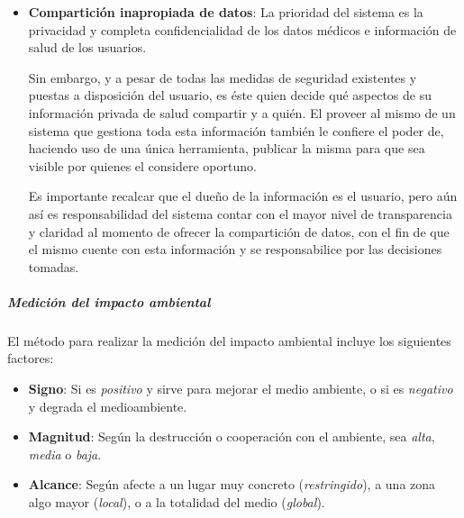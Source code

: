 {\begin{itemize}
    La implantación del sistema y uso por parte de la sociedad implicaría una menor concurrencia a hospitales e instituciones de salud, considerando aquellas asistencias que tengan por propósito el retiro de estudios médicos, consultas de baja complejidad o entrega de resultados médicos al profesional que los requirió, para su lectura y análisis.
    Esto tiene por consecuencia principal una menor cantidad de personas trasladándose a las instituciones de salud, lo que provoca reducir el parque automotor activo y, por lo tanto, eliminar una fracción de la contaminación vehicular existente en la actualidad.
    
    
    \item \textbf{Compartición inapropiada de datos}:
    La prioridad del sistema es la privacidad y completa confidencialidad de los datos médicos e información de salud de los usuarios.
    
    Sin embargo, y a pesar de todas las medidas de seguridad existentes y puestas a disposición del usuario, es éste quien decide qué aspectos de su información privada de salud compartir y a quién.
    El proveer al mismo de un sistema que gestiona toda esta información también le confiere el poder de, haciendo uso de una única herramienta, publicar la misma para que sea visible por quienes el considere oportuno.
    
    Es importante recalcar que el dueño de la información es el usuario, pero aún así es responsabilidad del sistema contar con el mayor nivel de transparencia y claridad al momento de ofrecer la compartición de datos, con el fin de que el mismo cuente con esta información y se responsabilice por las decisiones tomadas.
\end{itemize}


\subparagraph{Medición del impacto ambiental}

El método para realizar la medición del impacto ambiental incluye los siguientes factores:

\begin{itemize}
    \item \textbf{Signo}:
    Si es \textit{positivo} y sirve para mejorar el medio ambiente, o si es \textit{negativo} y degrada el medioambiente.
    
    \item \textbf{Magnitud}:
    Según la destrucción o cooperación con el ambiente, sea \textit{alta}, \textit{media} o \textit{baja}.
    
    \item \textbf{Alcance}:
    Según afecte a un lugar muy concreto (\textit{restringido}), a una zona algo mayor (\textit{local}), o a la totalidad del medio (\textit{global}).
    

\end{itemize}}
